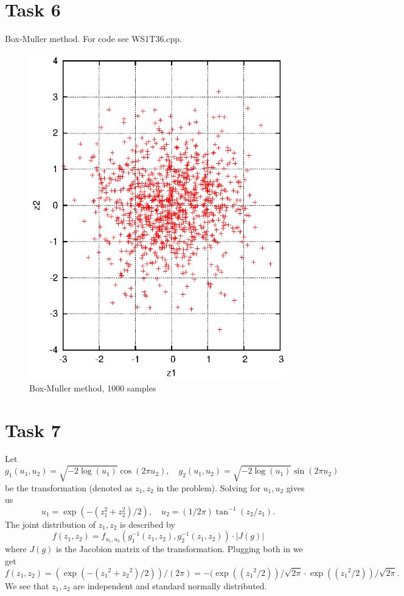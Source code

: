 \documentclass[]{article}
\begin{document}
\section*{Task 6} Box-Muller method. For code see WS1T36.cpp.
\begin{figure}[!ht]
\centering
\includegraphics{task6}
\caption{Box-Muller method, 1000 samples}
\label{fig:Task6}
\end{figure}

\section*{Task 7} Let \[g_1(u_1,u_2)=\sqrt{-2\log(u_1)}\cos(2\pi
u_2),\quad g_2(u_1,u_2)=\sqrt{-2\log(u_1)}\sin(2\pi u_2)\] be the transformation
(denoted as $z_1, z_2$ in the problem). Solving for $u_1,u_2$ gives us \[u_1 =
\exp({-(z_1 ^2+ z_2 ^2)/2}),\quad u_2 = (1/2\pi)\tan^{-1} (z_2/z_1).\] The joint
distribution of $z_1, z_2$ is described by \[f(z_1 ,z_2) = f_{u_1,
u_2}(g_1^{-1}(z_1,z_2),g_2^{-1}(z_1,z_2))\cdot| J(g) |\] where $J(g)$ is the
Jacobion matrix of the transformation. Plugging both in we get
\[f(z_1,z_2)=(\exp(-({z_1}^2+{z_2}^2)/2))/(2\pi)=-(\exp(({z_1}^2/2))/\sqrt{2\pi}\cdot\exp(({z_1}^2/2))/\sqrt{2\pi}.\]
We see that $z_1,z_2$ are independent and standard normally distributed.
\end{document}
